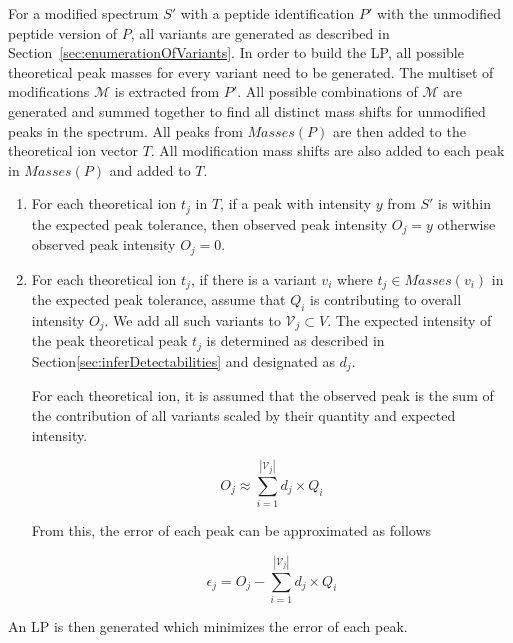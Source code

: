 \documentclass[11pt]{article}
\begin{document}
{For a modified spectrum $S'$ with a peptide identification $P'$ with the unmodified peptide version of $P$, all variants are generated as described in Section~\ref{sec:enumerationOfVariants}. In order to build the LP, all possible theoretical peak masses for every variant need to be generated. The multiset of modifications $\mathcal{M}$ is extracted from $P'$. All possible combinations of $\mathcal{M}$ are generated and summed together to find all distinct mass shifts for unmodified peaks in the spectrum. All peaks from $Masses(P)$ are then added to the theoretical ion vector $T$. All modification mass shifts are also added to each peak in $Masses(P)$ and added to $T$. 

\begin{enumerate}

\item For each theoretical ion $t_j$ in $T$, if a peak with intensity $y$ from $S'$ is within the expected peak tolerance, then observed peak intensity $O_j = y$ otherwise observed peak intensity $O_j = 0$.

\item For each theoretical ion $t_j$, if there is a variant $v_i$ where $t_j \in Masses(v_i)$ in the expected peak tolerance, assume that $Q_i$ is contributing to overall intensity $O_j$. We add all such variants to $\mathcal{V}_j \subset V$. The expected intensity of the peak theoretical peak $t_j$ is determined as described in Section\ref{sec:inferDetectabilities} and designated as $d_j$. 

For each theoretical ion, it is assumed that the observed peak is the sum of the contribution of all variants scaled by their quantity and expected intensity.

\[
O_j \approx \sum_{i=1}^{|\mathcal{V}_j|}  d_j \times {Q_i}
\]

From this, the error of each peak can be approximated as follows

\[
\epsilon_j = O_j - \sum_{i=1}^{|\mathcal{V}_j|} d_j \times{Q_i}
\]
\end{enumerate}

An LP is then generated which minimizes the error of each peak.

}
\end{document}
